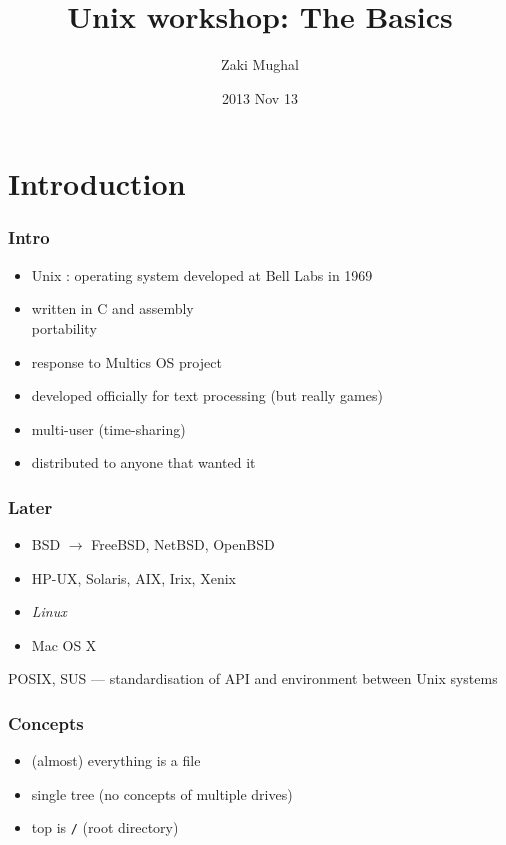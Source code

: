 \documentclass[%
        hyperref={%
                pdfauthor={Zakariyya Mughal},%
                pdfpagemode={None},pdfpagelayout={SinglePage}}%
        xcolor={x11names},%
]{beamer}
\title[Unix Basics]{Unix workshop: The Basics}
\author{Zaki Mughal}
\institute{Computational Biomedicine Lab\\University of Houston}
\date{2013 Nov 13}
\begin{document}
\frame{\titlepage}
\section{Introduction}\frame{\insertsection}
\begin{frame}
	\frametitle{Intro}
	\begin{itemize}
		\item Unix : operating system developed at Bell
			Labs in 1969
		\pause\item written in C and assembly \\
			\pause \qquad portability
		\pause\item response to Multics OS project
		\pause \item developed officially for text processing \pause (but
			really games)
		\pause \item multi-user (time-sharing)
		\pause \item distributed to anyone that wanted it
	\end{itemize}
\end{frame}

\begin{frame}
	\frametitle{Later}
	\begin{itemize}
		\item BSD $\rightarrow$ FreeBSD, NetBSD, OpenBSD
		\pause \item HP-UX, Solaris, AIX, Irix, Xenix
		\pause \item \emph{Linux}
		\pause \item Mac OS X
	\end{itemize}

	\pause POSIX, SUS --- standardisation of API and environment between
	Unix systems
\end{frame}

\begin{frame}
	\frametitle{Concepts}
	\begin{itemize}
		\item (almost) everything is a file
		\item single tree (no concepts of multiple drives)
		\item top is \texttt{/} (root directory)
	\end{itemize}
\end{frame}
\end{document}
